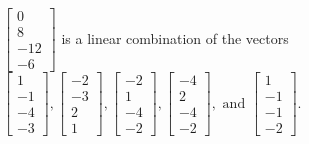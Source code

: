 \begin{exercise}
\begin{exerciseStatement}
  \end{exerciseStatement}
  \begin{exerciseAnswer}
   \(\left[\begin{array}{c}
0 \\
8 \\
-12 \\
-6
\end{array}\right]\) 
  	 is  
	a linear combination of the vectors \(\left[\begin{array}{c}
1 \\
-1 \\
-4 \\
-3
\end{array}\right] , \left[\begin{array}{c}
-2 \\
-3 \\
2 \\
1
\end{array}\right] , \left[\begin{array}{c}
-2 \\
1 \\
-4 \\
-2
\end{array}\right] , \left[\begin{array}{c}
-4 \\
2 \\
-4 \\
-2
\end{array}\right] , \text{ and } \left[\begin{array}{c}
1 \\
-1 \\
-1 \\
-2
\end{array}\right]\).

	
  


  \end{exerciseAnswer}
\end{exercise}